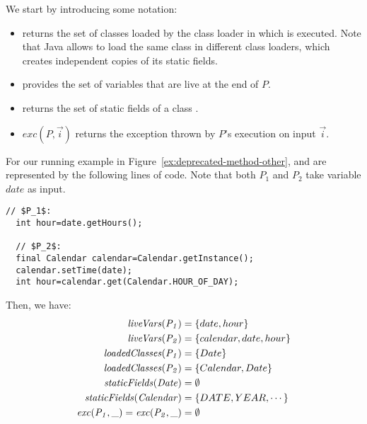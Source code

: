 \documentclass[sigconf,review,anonymous]{acmart}
\begin{document}
We start by introducing some notation:
\begin{itemize}
\item {} returns the set of classes loaded by the class loader
  in which  is executed. Note that Java allows to load the same class
in different class loaders, which creates independent copies of its
static fields.
\item {} provides the set of variables that are live
at the end of $P$. %
\item {} returns
  the set of static fields of a class .
\item $exc(P, \vec{i})$ returns the exception thrown by $P$'s execution on input $\vec{i}$.  
\end{itemize}  

\begin{example}\label{ex:defs}
  For our running example in Figure~\ref{ex:deprecated-method-other},
   and  are represented by the following lines of code. Note that
  both $P_1$ and $P_2$ take variable $date$ as input.

\begin{lstlisting}[mathescape=true,showstringspaces=false]
  // $P_1$:
  int hour=date.getHours();

  // $P_2$:
  final Calendar calendar=Calendar.getInstance();
  calendar.setTime(date);
  int hour=calendar.get(Calendar.HOUR_OF_DAY);
\end{lstlisting}
%
Then, we have:
\[
\begin{aligned}[t]
  \mathit{{liveVars(P_1)}} &= \{date, hour\}\\
  \mathit{{liveVars(P_2)}} &= \{calendar, date, hour\}\\  
  \mathit{{loadedClasses(P_1)}} &= \{Date\} \\
  \mathit{{loadedClasses(P_2)}} &= \{Calendar, Date\} \\  
  \mathit{{staticFields(Date)}} &= \emptyset\\
  \mathit{{staticFields(Calendar)}} &= \{DATE, YEAR, \cdots\}\\
  \mathit{{exc(P_1, \_)}}=\mathit{{exc(P_2, \_)}} &=\emptyset
\end{aligned}
\]
\end{example}

\end{document}

